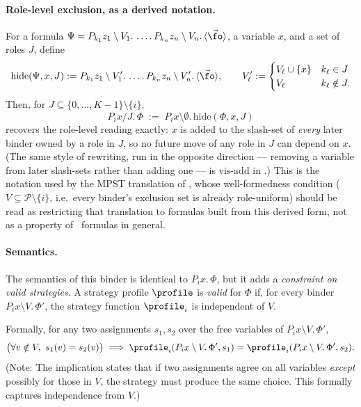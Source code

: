 \paragraph{Role-level exclusion, as a derived notation.}
For a formula $\Psi = P_{k_1}z_1\setminus V_1.\,\dots.\,P_{k_n}z_n\setminus
V_n.\,\langle\vec\fo\rangle$, a variable $x$, and a set of roles $J$, define
\[
  \mathrm{hide}(\Psi,x,J) :=
  P_{k_1}z_1\setminus V_1'.\,\dots.\,P_{k_n}z_n\setminus V_n'.\,\langle\vec\fo\rangle,
  \qquad
  V_\ell' := \begin{cases} V_\ell\cup\{x\} & k_\ell\in J\\ V_\ell & k_\ell\notin J.\end{cases}
\]
Then, for $J \subseteq \{0,\dots,K-1\}\setminus\{i\}$,
\[
  P_i x / J.\,\Phi \;:=\; P_i x\setminus\emptyset.\,\mathrm{hide}(\Phi,x,J)
\]
recovers the role-level reading exactly: $x$ is added to the slash-set of
\emph{every} later binder owned by a role in $J$, so no future move of any
role in $J$ can depend on $x$. (The same style of rewriting, run in the
opposite direction --- removing a variable from later slash-sets rather than
adding one --- is $\mathrm{vis\text{-}add}$ in
.) This is the notation used by the MPST
translation of , whose well-formedness condition
($V\subseteq\mathcal P\setminus\{i\}$, i.e.\ every binder's exclusion set is
already role-uniform) should be read as restricting that translation to
formulas built from this derived form, not as a property of \KFOL\ formulas
in general.

\paragraph{Semantics.}
The semantics of this binder is identical to $P_i x.\,\Phi$,
but it adds a \emph{constraint on valid strategies}.
A strategy profile $\profile$ is \emph{valid} for $\Phi$ if,
for every binder $P_i x \setminus V.\,\Phi'$, the strategy
function $\profile_i$ is independent of $V$.

Formally, for any two assignments $s_1, s_2$ over the free
variables of $P_i x \setminus V.\,\Phi'$,
\[
\bigl(\forall v \notin V,\ s_1(v) = s_2(v)\bigr)
\implies
\profile_i(P_i x \setminus V.\,\Phi', s_1) = \profile_i(P_i x \setminus V.\,\Phi', s_2).
\]
(Note: The implication states that if two assignments agree on all
variables \emph{except} possibly for those in $V$, the strategy must
produce the same choice. This formally captures independence from $V$.)

